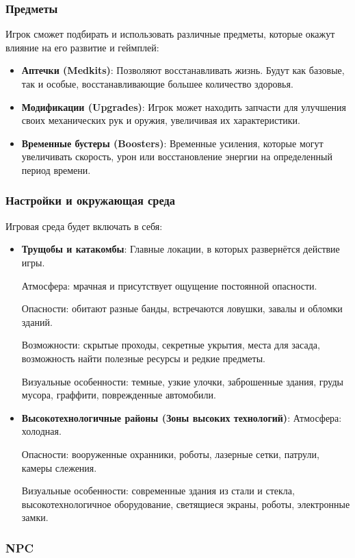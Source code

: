 \documentclass{article}
\begin{document}
\subsubsection{Предметы}
Игрок сможет подбирать и использовать различные предметы, которые окажут влияние на его развитие и геймплей:
\begin{itemize}
    \item \textbf{Аптечки (Medkits)}: Позволяют восстанавливать жизнь. Будут как базовые, так и особые, восстанавливающие большее количество здоровья.
    \item \textbf{Модификации (Upgrades)}: Игрок может находить запчасти для улучшения своих механических рук и оружия, увеличивая их характеристики.
    \item \textbf{Временные бустеры (Boosters)}: Временные усиления, которые могут увеличивать скорость, урон или восстановление энергии на определенный период времени.
\end{itemize}

\subsubsection{Настройки и окружающая среда}
Игровая среда будет включать в себя:
\begin{itemize}
    \item \textbf{Трущобы и катакомбы}: Главные локации, в которых развернётся действие игры. 
    
    Атмосфера: мрачная и присутствует ощущение постоянной опасности.

    Опасности: обитают разные банды, встречаются ловушки, завалы и обломки зданий.

    Возможности: скрытые проходы, секретные укрытия, места для засада, возможность найти полезные ресурсы и редкие предметы.

    Визуальные особенности: темные, узкие улочки, заброшенные здания, груды мусора, граффити, поврежденные автомобили.
    \item \textbf{Высокотехнологичные районы (Зоны высоких технологий)}:  
    Атмосфера: холодная. 

    Опасности: вооруженные охранники, роботы, лазерные сетки, патрули, камеры слежения.

    Визуальные особенности: современные здания из стали и стекла, высокотехнологичное оборудование, светящиеся экраны, роботы, электронные замки.
\end{itemize}
\subsubsection{NPC}
\end{document}
